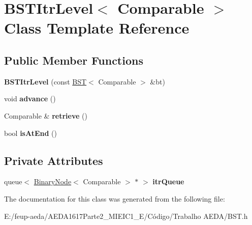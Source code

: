 \hypertarget{class_b_s_t_itr_level}{}\section{B\+S\+T\+Itr\+Level$<$ Comparable $>$ Class Template Reference}
\label{class_b_s_t_itr_level}
\subsection*{Public Member Functions}
\begin{DoxyCompactItemize}
\item 
\mbox{\label{class_b_s_t_itr_level_a8fd5cdde93eb182c4cd5cf6b2c5efaeb}} 
{\bfseries B\+S\+T\+Itr\+Level} (const \hyperlink{class_b_s_t}{B\+ST}$<$ Comparable $>$ \&bt)
\item 
\mbox{\label{class_b_s_t_itr_level_ad54a6fa289a59d6050b507abe40d463b}} 
void {\bfseries advance} ()
\item 
\mbox{\label{class_b_s_t_itr_level_a0340bd9f21f72ae25348f383e67e7f91}} 
Comparable \& {\bfseries retrieve} ()
\item 
\mbox{\label{class_b_s_t_itr_level_a89bc8e81dde255fd6bad917cacc0d489}} 
bool {\bfseries is\+At\+End} ()
\end{DoxyCompactItemize}
\subsection*{Private Attributes}
\begin{DoxyCompactItemize}
\item 
\mbox{\label{class_b_s_t_itr_level_a6de8f9f3e129e2a358b00ffa35abcb0e}} 
queue$<$ \hyperlink{class_binary_node}{Binary\+Node}$<$ Comparable $>$ $\ast$ $>$ {\bfseries itr\+Queue}
\end{DoxyCompactItemize}


The documentation for this class was generated from the following file\+:\begin{DoxyCompactItemize}
\item 
E\+:/feup-\/aeda/\+A\+E\+D\+A1617\+Parte2\+\_\+M\+I\+E\+I\+C1\+\_\+\+E/\+Código/\+Trabalho A\+E\+D\+A/B\+S\+T.\+h\end{DoxyCompactItemize}
